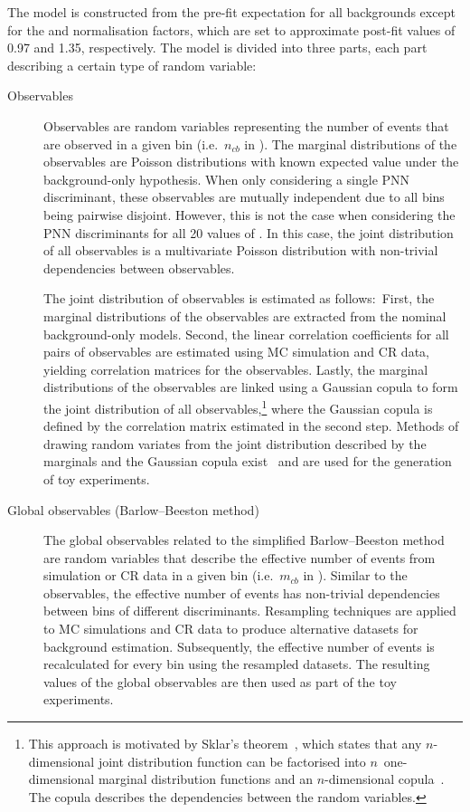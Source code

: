 The model is constructed from the pre-fit expectation for all backgrounds except
for the \ttbar and \ZHF normalisation factors, which are set to approximate
post-fit values of 0.97 and 1.35, respectively. The model is divided into three
parts, each part describing a certain type of random variable:
\begin{description}

\item[Observables] Observables are random variables representing the number of
  events that are observed in a given bin (i.e.~$n_{cb}$ in
  ). The marginal distributions of the
  observables are Poisson distributions with known expected value under the
  background-only hypothesis. When only considering a single PNN discriminant,
  these observables are mutually independent due to all bins being pairwise
  disjoint. However, this is not the case when considering the PNN discriminants
  for all 20 values of \mX. In this case, the joint distribution of all
  observables is a multivariate Poisson distribution with non-trivial
  dependencies between observables.

  The joint distribution of observables is estimated as follows:~First, the
  marginal distributions of the observables are extracted from the nominal
  background-only models. Second, the linear correlation coefficients for all
  pairs of observables are estimated using MC simulation and CR data, yielding
  correlation matrices for the observables. Lastly, the marginal distributions
  of the observables are linked using a Gaussian copula to form the joint
  distribution of all observables,\footnote{This approach is motivated by
    Sklar's theorem~\cite{Sklar1959FonctionsDR}, which states that any
    $n$-dimensional joint distribution function can be factorised into
    $n$~one-dimensional marginal distribution functions and an $n$-dimensional
    copula~\cite{nelsen}. The copula describes the dependencies between the
    random variables.} where the Gaussian copula is defined by the correlation
  matrix estimated in the second step. Methods of drawing random variates from
  the joint distribution described by the marginals and the Gaussian copula
  exist~\cite{nelsen} and are used for the generation of toy experiments.

\item[Global observables (Barlow--Beeston method)] The global observables
  related to the simplified Barlow--Beeston method are random variables that
  describe the effective number of events from simulation or CR data
  in a given bin (i.e.~$m_{cb}$ in
  ). Similar to the observables, the
  effective number of events has non-trivial dependencies between
  bins of different discriminants. Resampling techniques are applied to MC
  simulations and CR data to produce alternative datasets for background
  estimation. Subsequently, the effective number of events is
  recalculated for every bin using the resampled datasets. The resulting values
  of the global observables are then used as part of the toy experiments.


\end{description}
